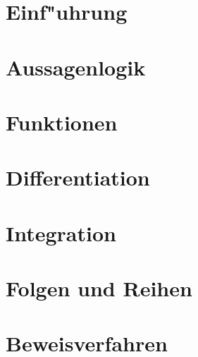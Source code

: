 \documentclass[12pt,a4paper,titlepage]{scrartcl}
\newcommand{\psection}[1]{\pagebreak\section{#1}}
\begin{document}

\clearpage

\psection{Einf"uhrung}


\psection{Aussagenlogik}



\psection{Funktionen}


\psection{Differentiation}


\psection{Integration}


\psection{Folgen und Reihen}


\psection{Beweisverfahren}

\end{document}
